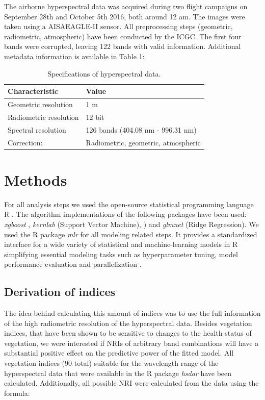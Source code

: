 \documentclass[review]{elsarticle}
\begin{document}
The airborne hyperspectral data was acquired during two flight campaigns on September 28th and October 5th 2016, both around 12 am.
The images were taken using a AISAEAGLE-II sensor.
All preprocessing steps (geometric, radiometric, atmospheric) have been conducted by the \ac{ICGC}.
The first four bands were corrupted, leaving 122 bands with valid information.
Additional metadata information is available in Table 1:

\begin{table}[b!]
\centering
\caption[t]{Specifications of hyperspectral data.}
\begingroup\footnotesize
\begin{tabular}{ll}
	\\
	Characteristic         & Value                               \\
	\hline
	Geometric resolution   & 1 m                                 \\
	Radiometric resolution & 12 bit                              \\
	Spectral resolution    & 126 bands (404.08 nm - 996.31 nm)   \\
	Correction:            & Radiometric, geometric, atmospheric
\end{tabular}
\endgroup
\label{tab:hyperparameter_limits}
\end{table}

\section{Methods}

For all analysis steps we used the open-source statistical programming language R \citep{R_core}.
The algorithm implementations of the following packages have been used: \textit{xgboost} \citep{chenXGBoostScalableTree2016}, \textit{kernlab} \citep{kernlab} (Support Vector Machine), \cite{Vapnik1998}) and \textit{glmnet} \citep{glmnet} (Ridge Regression).
We used the R package \textit{mlr} for all modeling related steps.
It provides a standardized interface for a wide variety of statistical and machine-learning models in R simplifying essential modeling tasks such as hyperparameter tuning, model performance evaluation and parallelization \citep{bischlMlrMachineLearning2016}.

\subsection{Derivation of indices}

The idea behind calculating this amount of indices was to use the full information of the high radiometric resolution of the hyperspectral data.
Besides vegetation indices, that have been shown to be sensitive to changes to the health status of vegetation, we were interested if NRIs of arbitrary band combinations will have a substantial positive effect on the predictive power of the fitted model.
All vegetation indices (90 total) suitable for the wavelength range of the hyperspectral data that were available in the R package \textit{hsdar} have been calculated.
Additionally, all possible \ac{NRI} were calculated from the data using the formula:
\end{document}
